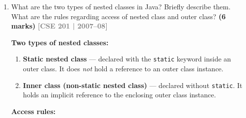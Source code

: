 \documentclass[12pt,a3paper]{article}
\newcommand{\yr}[1]{\hfill\textcolor{gray}{\small\textbf{[#1]}}}
\newcommand{\mk}[1]{\textcolor{orange!70!black}{\small\textbf{(#1 marks)}}}
\begin{document}
\begin{enumerate}
\begin{tcolorbox}
\begin{enumerate}[label=\textbf{\arabic*.}]
  \item A class can implement multiple interfaces but extend only one
    abstract class.

  \item Technically, the JVM does treat interfaces as a special kind
    of abstract type, but the statement ``all interfaces \emph{are}
    abstract classes'' is misleading because the two serve different
    design purposes.
\end{enumerate}

\textbf{Correct statement:} Every interface is \emph{implicitly
abstract}, but it is \emph{not} an abstract class --- it is its own
independent type.

\end{tcolorbox}

\item What are the two types of nested classes in Java? Briefly describe them. What are the rules regarding access of nested class and outer class? \mk{6}
\yr{CSE 201 | 2007--08}

\begin{tcolorbox}[enhanced,breakable,ansbox,
  colback=cD!4,colframe=cD,boxrule=0.8pt,arc=5pt,
  title={\textbf{Answer --- Types of Nested Classes \& Access Rules}},
  fonttitle=\bfseries\color{white},colbacktitle=cD]

\textbf{Two types of nested classes:}

\begin{enumerate}[label=\textbf{\arabic*.}]
  \item \textbf{Static nested class} --- declared with the
    \texttt{static} keyword inside an outer class.
    It does \emph{not} hold a reference to an outer class instance.

  \item \textbf{Inner class (non-static nested class)} --- declared
    without \texttt{static}.  It holds an implicit reference to the
    enclosing outer class instance.
\end{enumerate}

\medskip
\textbf{Access rules:}


\end{tcolorbox}
\end{enumerate}
\end{document}
